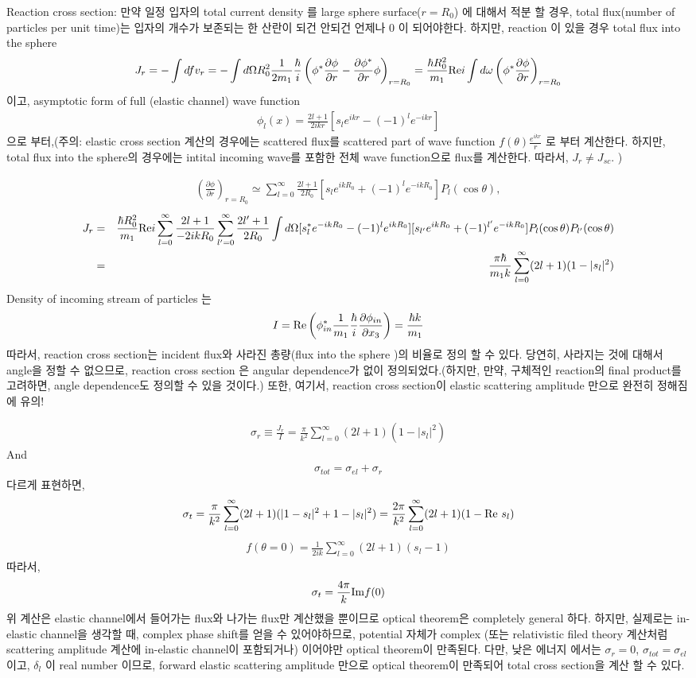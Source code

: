\documentclass[10pt]{book}
\newcommand{\bea}{\begin{eqnarray}}
\newcommand{\eea}{\end{eqnarray}}
\newcommand{\no}{\nonumber \\}
\newcommand{\del}{\partial}
\begin{document}
Reaction cross section: 만약 일정 입자의 
total current density 를 large sphere
surface($r=R_0$) 에 대해서 적분 할 경우, 
total flux(number of particles per unit time)는 
입자의 개수가 보존되는 한 산란이 되건 안되건 
언제나 0 이 되어야한다. 하지만, reaction 이 있을 경우 
total flux into the sphere 
\bea
J_r=-\int df v_r
   =-\int d\Omega R_0^2 \frac{1}{2m_1}\frac{\hbar}{i}
    \left(\phi^*\frac{\del \phi}{\del r}
    -\frac{\del \phi^*}{\del r}\phi \right)_{r=R_0}
   =\frac{\hbar R_0^2}{m_1}{\rm Re} i\int d\omega
   \left(\phi^*\frac{\del\phi}{\del r}\right)_{r=R_0} 
\eea
이고, asymptotic form of full (elastic channel) wave function
\bea
\phi_l(x)=\frac{2l+1}{2ikr}[s_l e^{ikr}-(-1)^l e^{-ikr}] 
\eea
으로 부터,(주의: elastic cross section 계산의 경우에는 
scattered flux를 scattered part of wave function $f(\theta)\frac{e^{ikr}}{r}$
로 부터 계산한다. 하지만, total flux into the sphere의 경우에는 
intital incoming wave를 포함한 전체 wave function으로 
flux를 계산한다. 따라서, $J_r\neq J_{sc}$.
)

\bea
\left(\frac{\del\phi}{\del r}\right)_{r=R_0}
\simeq \sum_{l=0}^\infty \frac{2l+1}{2R_0}
 [s_le^{ikR_0}+(-1)^l e^{-ikR_0}]P_l(\cos\theta),
\eea
\bea
J_r&=&\frac{\hbar R_0^2}{m_1}{\rm Re} i
  \sum_{l=0}^\infty \frac{2l+1}{-2ik R_0}
  \sum_{l'=0}^\infty \frac{2l'+1}{2R_0}
  \int d\Omega
  [s_l^* e^{-ikR_0}-(-1)^l e^{ikR_0}]
  [s_{l'}e^{ikR_0}+(-1)^{l'}e^{-ikR_0}]
  P_l(\cos\theta) P_{l'}(\cos\theta)
  \no &=&\frac{\pi\hbar}{m_1 k}\sum_{l=0}^\infty(2l+1)(1-|s_l|^2) 
\eea
Density of incoming stream of particles 는
\bea
I={\rm Re}\left( \phi_{in}^* \frac{1}{m_1}\frac{\hbar}{i}
  \frac{\del \phi_{in}}{\del x_3}\right)=\frac{\hbar k}{m_1}
\eea
따라서, reaction cross section는 incident flux와
사라진 총량(flux into the sphere )의
비율로 정의 할 수 있다. 당연히, 사라지는 것에 대해서 angle을
정할 수 없으므로, reaction cross section 은 
angular dependence가 없이 정의되었다.(하지만,
만약, 구체적인 reaction의 final product를 고려하면,
angle dependence도 정의할 수 있을 것이다.) 또한,
여기서, reaction cross section이 elastic scattering amplitude
만으로 완전히 정해짐에 유의!

\bea
\sigma_r\equiv\frac{J_r}{I}
 =\frac{\pi}{k^2}\sum_{l=0}^\infty (2l+1)(1-|s_l|^2)
\eea
And
\bea
\sigma_{tot}=\sigma_{el}+\sigma_r
\eea
다르게 표현하면,
\bea
\sigma_t=\frac{\pi}{k^2}\sum_{l=0}^\infty(2l+1)
   (|1-s_l|^2+1-|s_l|^2)
   =\frac{2\pi}{k^2}\sum_{l=0}^\infty (2l+1)(1-{\rm Re}\ s_l)
\eea
\bea
f(\theta=0)=\frac{1}{2ik}\sum_{l=0}^\infty (2l+1)(s_l-1)
\eea
따라서,
\bea
\sigma_t=\frac{4\pi}{k}{\rm Im} f(0)
\eea
위 계산은 
elastic channel에서 들어가는 flux와 나가는 flux만 계산했을 뿐이므로
optical theorem은 completely general 하다.
하지만, 실제로는 in-elastic channel을 생각할 때, complex phase shift를 
얻을 수 있어야하므로, potential 자체가 complex
(또는 relativistic filed theory 계산처럼 
scattering amplitude 계산에 in-elastic channel이 포함되거나) 이어야만 
optical theorem이 만족된다.  다만, 
낮은 에너지 에서는 $\sigma_r=0$, 
$\sigma_{tot}=\sigma_{el}$ 이고, $\delta_l$ 이 real number 이므로,
forward elastic scattering amplitude 만으로 optical theorem이 만족되어
total cross section을 계산 할 수 있다. 
\end{document}
